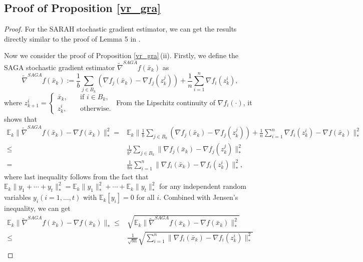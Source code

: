 \documentclass[letterpaper]{article} %
\begin{document}
	\subsection{Proof of  Proposition \ref{vr_gra}}\label{proof_vr_gra}
	\begin{proof}
		For the SARAH stochastic gradient estimator,  we can get the results directly similar to the proof of Lemma 5 in \cite{WangH23}. 
		
		Now we  consider the proof of Proposition \ref{vr_gra}\,(ii). Firstly, we define the SAGA stochastic gradient estimator $\tilde{\nabla}^{SAGA}f(\bar{x}_{k})$ as 
		\[
		\tilde{\nabla}^{SAGA}f(\bar{x}_{k}):= \frac{1}{b}\sum_{j\in B_{k}}\left(\nabla f_{j}(\bar{x}_{k})-\nabla f_{j}(z_{k}^{j})\right)+\frac{1}{n}\sum_{i=1}^{n}\nabla f_{i}(z_{k}^{i}),
		\]
		where $ z_{k+1}^{i}=\begin{cases}
			\bar{x}_{k},\quad&\text{if }i\in B_{k},\\
			z_{k}^{i},\quad &\text{otherwise}.
		\end{cases}$ 
		From the Lipschitz continuity of $\nabla f_{i}(\cdot)$, it shows that
		\begin{align*}
			\mathbb{E}_{k}\|\tilde{\nabla}^{SAGA}f(\bar{x}_{k})-\nabla f(\bar{x}_{k})\|_{*}^{2}
			=&\mathbb{E}_{k}\|\frac{1}{b}\sum_{j\in B_{k}}\left(\nabla f_{j}(\bar{x}_{k})-\nabla f_{j}(z_{k}^{j})\right)+\frac{1}{n}\sum_{i=1}^{n}\nabla f_{i}(z_{k}^{i})-\nabla f(\bar{x}_{k})\|_{*}^{2}\\
			\le&\frac{1}{b^{2}}\sum_{j\in B_{k}}\|\nabla f_{j}(\bar{x}_{k})-\nabla f_{j}(z_{k}^{j})\|_{*}^{2}\\
			=&\frac{1}{bn}\sum_{i=1}^{n}\|\nabla f_{i}(\bar{x}_{k})-\nabla f_{i}(z_{k}^{i})\|_{*}^{2},
		\end{align*}
		where last inequality follows from the fact that $\mathbb{E}_{k}\|y_{1}+\cdots+y_{t}\|_{*}^{2}=\mathbb{E}_{k}\|y_{1}\|_{*}^{2}+\cdots+\mathbb{E}_{k}\|y_{t}\|_{*}^{2}$ for any independent random variables $y_{i} (i=1,\dots,t)$ with $\mathbb{E}_{k}[y_{i}]=0$ for all $i$. Combined with Jensen's inequality, we can get 
		\begin{align*}
			\mathbb{E}_{k}\|\tilde{\nabla}^{SAGA}f(\bar{x}_{k})-\nabla f(\bar{x}_{k})\|_{*}
			\le&\sqrt{\mathbb{E}_{k}\|\tilde{\nabla}^{SAGA}f(\bar{x}_{k})-\nabla f(\bar{x}_{k})\|_{*}^{2}}\\
			\le&\frac{1}{\sqrt{bn}}\sqrt{\sum_{i=1}^{n}\|\nabla f_{i}(\bar{x}_{k})-\nabla f_{i}(z_{k}^{i})\|_{*}^{2}}\\

\end{align*}
\end{proof}
\end{document}
